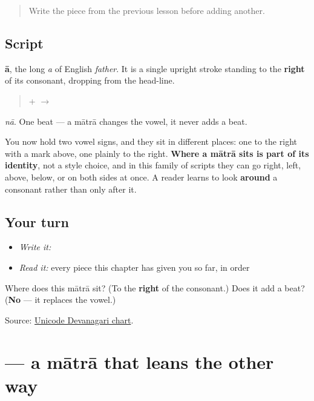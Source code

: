 \begin{quote}
Write the piece from the previous lesson before adding another.
\end{quote}

\subsection*{Script}
\begin{quote}
\end{quote}

\textbf{ā}, the long \emph{a} of English \emph{father}. It is a single upright stroke standing to the \textbf{right} of its consonant, dropping from the head-line.

\begin{quote}
\textbf{} + \textbf{} $\to$ \textbf{}
\end{quote}

\emph{nā}. One beat — a mātrā changes the vowel, it never adds a beat.

You now hold two vowel signs, and they sit in different places: one to the right with a mark above, one plainly to the right. \textbf{Where a mātrā sits is part of its identity}, not a style choice, and in this family of scripts they can go right, left, above, below, or on both sides at once. A reader learns to look \textbf{around} a consonant rather than only after it.

\subsection*{Your turn}
\begin{itemize}
\raggedright
  \item \emph{Write it:} 
  \item \emph{Read it:} every piece this chapter has given you so far, in order
\end{itemize}

\begin{tcolorbox}[breakable,colback=teal!4,colframe=teal!35!black,title={Before you move on}]
Where does this mātrā sit? (To the \textbf{right} of the consonant.) Does it add a beat? (\textbf{No} — it replaces the vowel.)

Source: \href{https://www.unicode.org/charts/PDF/U0900.pdf}{Unicode Devanagari chart}.
\end{tcolorbox}
\section[-ī]{ — a mātrā that leans the other way}

